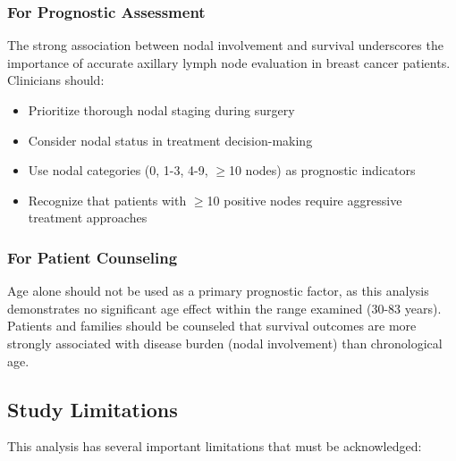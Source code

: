 \documentclass[12pt,a4paper]{article}
\begin{document}
\subsubsection{For Prognostic Assessment}

The strong association between nodal involvement and survival underscores the importance of accurate axillary lymph node evaluation in breast cancer patients. Clinicians should:

\begin{itemize}
    \item Prioritize thorough nodal staging during surgery
    \item Consider nodal status in treatment decision-making
    \item Use nodal categories (0, 1-3, 4-9, $\geq$10 nodes) as prognostic indicators
    \item Recognize that patients with $\geq$10 positive nodes require aggressive treatment approaches
\end{itemize}

\subsubsection{For Patient Counseling}

Age alone should not be used as a primary prognostic factor, as this analysis demonstrates no significant age effect within the range examined (30-83 years). Patients and families should be counseled that survival outcomes are more strongly associated with disease burden (nodal involvement) than chronological age.

\subsection{Study Limitations}

This analysis has several important limitations that must be acknowledged:
\end{document}

